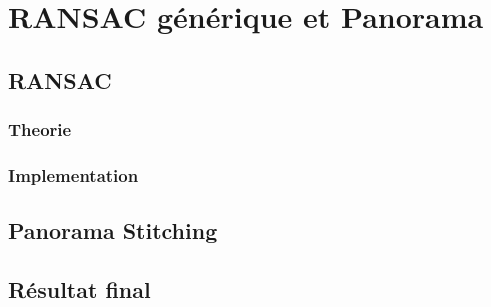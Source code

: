 \documentclass[11pt]{article}
\begin{document}
\section{RANSAC générique et Panorama}

\subsection{RANSAC}

\subsubsection{Theorie}

\subsubsection{Implementation}

\subsection{Panorama Stitching}

\subsection{Résultat final}
\end{document}
